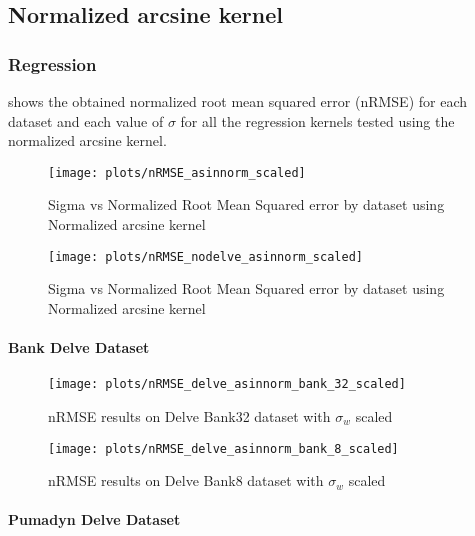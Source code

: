 
\subsection{Normalized arcsine kernel}

\subsubsection{Regression}

 shows the obtained normalized root mean
squared error (nRMSE) for each dataset and each value of $\sigma$ for all the
regression kernels tested using the normalized arcsine kernel.

\begin{figure}[H]
    \texttt{[image: plots/nRMSE\_asinnorm\_scaled]}
    \caption{Sigma vs Normalized Root Mean Squared error by dataset using Normalized arcsine kernel}%
    \label{fig:nrmse-asinnorm-scaled}
\end{figure}

\begin{figure}[H]
    \texttt{[image: plots/nRMSE\_nodelve\_asinnorm\_scaled]}
    \caption{Sigma vs Normalized Root Mean Squared error by dataset using Normalized arcsine kernel}%
    \label{fig:nrmse-asinnorm-scaled}
\end{figure}

\paragraph{Bank Delve Dataset}


\begin{figure}[H]
    \texttt{[image: plots/nRMSE\_delve\_asinnorm\_bank\_32\_scaled]}
    \caption{nRMSE results on Delve Bank32 dataset with $\sigma_w$ scaled}
    \label{fig:nrmse-delve-asinnorm-bank-32-scaled}
\end{figure}

\begin{figure}[H]
    \texttt{[image: plots/nRMSE\_delve\_asinnorm\_bank\_8\_scaled]}
    \caption{nRMSE results on Delve Bank8 dataset with $\sigma_w$ scaled}
    \label{fig:nrmse-delve-asinnorm-bank-8-scaled}
\end{figure}


\paragraph{Pumadyn Delve Dataset}


